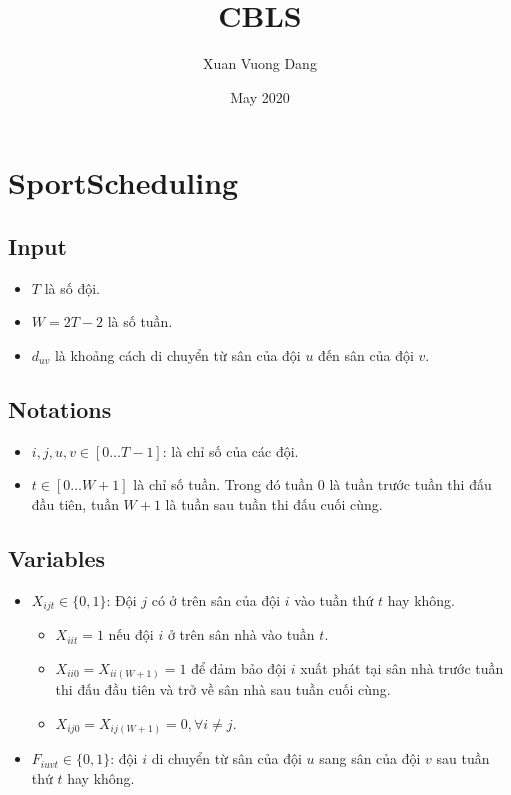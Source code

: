 \documentclass{article}
\title{CBLS}
\author{Xuan Vuong Dang}
\date{May 2020}
\begin{document}
\maketitle

\section{SportScheduling}

\subsection{Input}
\begin{itemize}
    \item $T$ là số đội.
    \item $W = 2T-2$ là số tuần.
    \item $d_{uv}$ là khoảng cách di chuyển từ sân của đội $u$ đến sân của đội $v$.
\end{itemize}

\subsection{Notations}
\begin{itemize}
    \item $i, j, u, v \in [0\ldots T-1]$: là chỉ số của các đội.
    \item $t \in [0\ldots W+1]$ là chỉ số tuần. Trong đó tuần $0$ là tuần trước tuần thi đấu đầu tiên, tuần $W+1$ là tuần sau tuần thi đấu cuối cùng.
\end{itemize}

\subsection{Variables}
\begin{itemize}
    \item $X_{ijt} \in \{0, 1\}$: Đội $j$ có ở trên sân của đội $i$ vào tuần thứ $t$ hay không.
    \begin{itemize}
        \item $X_{iit} = 1$ nếu đội $i$ ở trên sân nhà vào tuần $t$.
        \item $X_{ii0} = X_{ii(W+1)} = 1$ để đảm bảo đội $i$ xuất phát tại sân nhà trước tuần thi đấu đầu tiên và trở về sân nhà sau tuần cuối cùng.
        \item $X_{ij0} = X_{ij(W+1)} = 0, \forall i \ne j$.
  \end{itemize}
    \item $F_{iuvt} \in \{0, 1\}$: đội $i$ di chuyển từ sân của đội $u$ sang sân của đội $v$ sau tuần thứ $t$ hay không.
\end{itemize}
\end{document}
